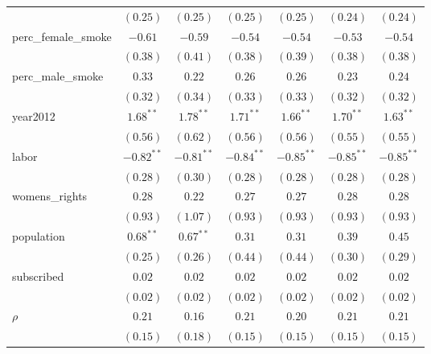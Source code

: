 \begin{table}[!h]
\begin{center}
\begin{tabular}{l c c c c c c }
                        & $(0.25)$     & $(0.25)$     & $(0.25)$     & $(0.25)$     & $(0.24)$     & $(0.24)$     \\
perc\_female\_smoke     & $-0.61$      & $-0.59$      & $-0.54$      & $-0.54$      & $-0.53$      & $-0.54$      \\
                        & $(0.38)$     & $(0.41)$     & $(0.38)$     & $(0.39)$     & $(0.38)$     & $(0.38)$     \\
perc\_male\_smoke       & $0.33$       & $0.22$       & $0.26$       & $0.26$       & $0.23$       & $0.24$       \\
                        & $(0.32)$     & $(0.34)$     & $(0.33)$     & $(0.33)$     & $(0.32)$     & $(0.32)$     \\
year2012                & $1.68^{**}$  & $1.78^{**}$  & $1.71^{**}$  & $1.66^{**}$  & $1.70^{**}$  & $1.63^{**}$  \\
                        & $(0.56)$     & $(0.62)$     & $(0.56)$     & $(0.56)$     & $(0.55)$     & $(0.55)$     \\
labor                   & $-0.82^{**}$ & $-0.81^{**}$ & $-0.84^{**}$ & $-0.85^{**}$ & $-0.85^{**}$ & $-0.85^{**}$ \\
                        & $(0.28)$     & $(0.30)$     & $(0.28)$     & $(0.28)$     & $(0.28)$     & $(0.28)$     \\
womens\_rights          & $0.28$       & $0.22$       & $0.27$       & $0.27$       & $0.28$       & $0.28$       \\
                        & $(0.93)$     & $(1.07)$     & $(0.93)$     & $(0.93)$     & $(0.93)$     & $(0.93)$     \\
population              & $0.68^{**}$  & $0.67^{**}$  & $0.31$       & $0.31$       & $0.39$       & $0.45$       \\
                        & $(0.25)$     & $(0.26)$     & $(0.44)$     & $(0.44)$     & $(0.30)$     & $(0.29)$     \\
subscribed              & $0.02$       & $0.02$       & $0.02$       & $0.02$       & $0.02$       & $0.02$       \\
                        & $(0.02)$     & $(0.02)$     & $(0.02)$     & $(0.02)$     & $(0.02)$     & $(0.02)$     \\
$\rho$                  & $0.21$       & $0.16$       & $0.21$       & $0.20$       & $0.21$       & $0.21$       \\
                        & $(0.15)$     & $(0.18)$     & $(0.15)$     & $(0.15)$     & $(0.15)$     & $(0.15)$     \\

\end{tabular}
\end{center}
\end{table}
